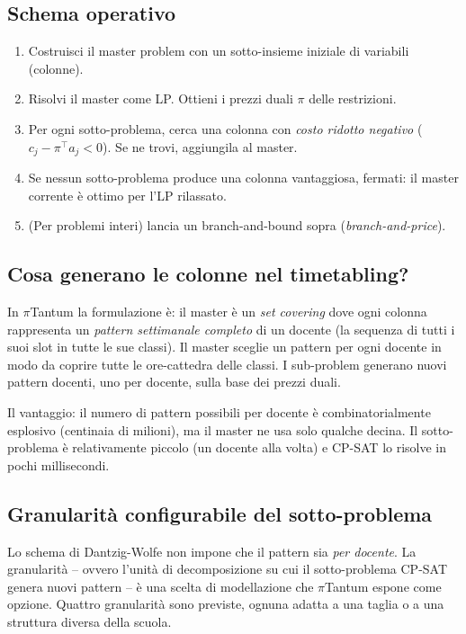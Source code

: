 \subsection{Schema operativo}

\begin{enumerate}
\item Costruisci il master problem con un sotto-insieme
  iniziale di variabili (colonne).
\item Risolvi il master come LP. Ottieni i prezzi duali
  $\pi$ delle restrizioni.
\item Per ogni sotto-problema, cerca una colonna con
  \emph{costo ridotto negativo} ($c_j - \pi^\top a_j < 0$).
  Se ne trovi, aggiungila al master.
\item Se nessun sotto-problema produce una colonna
  vantaggiosa, fermati: il master corrente \`e ottimo per
  l'LP rilassato.
\item (Per problemi interi) lancia un branch-and-bound
  sopra (\emph{branch-and-price}).
\end{enumerate}

\subsection{Cosa generano le colonne nel timetabling?}

In $\pi$Tantum la formulazione \`e: il master \`e un
\emph{set covering} dove ogni colonna rappresenta un
\emph{pattern settimanale completo} di un docente (la
sequenza di tutti i suoi slot in tutte le sue classi). Il
master sceglie un pattern per ogni docente in modo da
coprire tutte le ore-cattedra delle classi. I sub-problem
generano nuovi pattern docenti, uno per docente, sulla base
dei prezzi duali.

Il vantaggio: il numero di pattern possibili per docente \`e
combinatorialmente esplosivo (centinaia di milioni), ma il
master ne usa solo qualche decina. Il sotto-problema \`e
relativamente piccolo (un docente alla volta) e CP-SAT lo
risolve in pochi millisecondi.

\subsection{Granularit\`a configurabile del sotto-problema}

Lo schema di Dantzig-Wolfe non impone che il pattern sia
\emph{per docente}. La granularit\`a -- ovvero l'unit\`a di
decomposizione su cui il sotto-problema CP-SAT genera nuovi
pattern -- \`e una scelta di modellazione che $\pi$Tantum
espone come opzione. Quattro granularit\`a sono previste,
ognuna adatta a una taglia o a una struttura diversa della
scuola.


